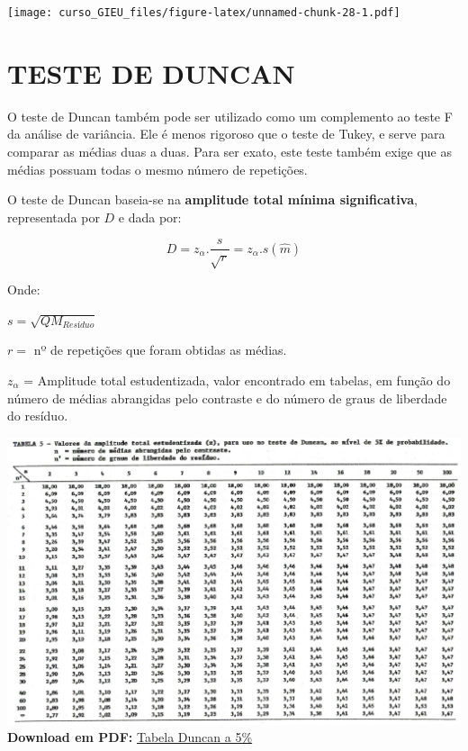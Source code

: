\documentclass[
]{book}
\newenvironment{Shaded}{\begin{snugshade}}{\end{snugshade}}
\newcommand{\CommentTok}[1]{\textcolor[rgb]{0.56,0.35,0.01}{\textit{#1}}}
\newcommand{\DataTypeTok}[1]{\textcolor[rgb]{0.13,0.29,0.53}{#1}}
\newcommand{\DecValTok}[1]{\textcolor[rgb]{0.00,0.00,0.81}{#1}}
\newcommand{\FloatTok}[1]{\textcolor[rgb]{0.00,0.00,0.81}{#1}}
\newcommand{\KeywordTok}[1]{\textcolor[rgb]{0.13,0.29,0.53}{\textbf{#1}}}
\newcommand{\NormalTok}[1]{#1}
\newcommand{\OperatorTok}[1]{\textcolor[rgb]{0.81,0.36,0.00}{\textbf{#1}}}
\newcommand{\StringTok}[1]{\textcolor[rgb]{0.31,0.60,0.02}{#1}}
\begin{document}
\begin{Shaded}
\end{Shaded}

\texttt{[image: curso\_GIEU\_files/figure-latex/unnamed-chunk-28-1.pdf]}

\hypertarget{teste-de-duncan}{%
\section{TESTE DE DUNCAN}\label{teste-de-duncan}}

O teste de Duncan também pode ser utilizado como um complemento ao teste F da análise de variância. Ele é menos rigoroso que o teste de Tukey, e serve para comparar as médias duas a duas. Para ser exato, este teste também exige que as médias possuam todas o mesmo número de repetições.

O teste de Duncan baseia-se na \textbf{amplitude total mínima significativa}, representada por \(D\) e dada por:

\[
 D= z_\alpha . \frac{s}{\sqrt{r}} = z_\alpha . s(\hat{m})
\]

Onde:

\(s = \sqrt{QM_{Resíduo}}\)

\(r =\) nº de repetições que foram obtidas as médias.

\(z_\alpha\) = Amplitude total estudentizada, valor encontrado em tabelas, em função do número de médias abrangidas pelo contraste e do número de graus de liberdade do resíduo.

\includegraphics{tDuncan.png}
\textbf{Download em PDF:} \href{https://github.com/arpanosso/ExpAgr_2020/raw/master/t_Duncan_5p.pdf}{Tabela Duncan a 5\%}
\end{document}
